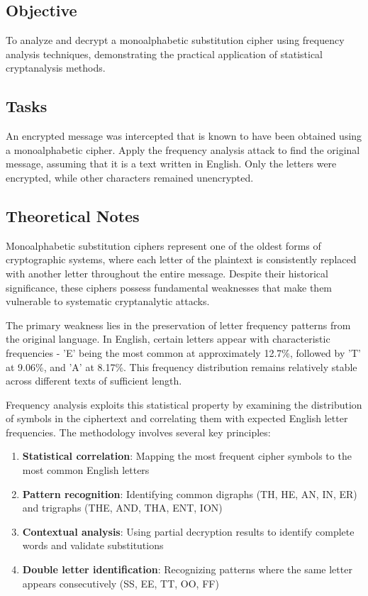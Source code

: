 \documentclass[a4paper,12pt]{article}
\begin{document}
\subsection{Objective}
\label{sec:org7906629}
To analyze and decrypt a monoalphabetic substitution cipher using frequency analysis techniques, demonstrating the practical application of statistical cryptanalysis methods.
\subsection{Tasks}
\label{sec:orgedfc051}
An encrypted message was intercepted that is known to have been obtained using a monoalphabetic cipher. Apply the frequency analysis attack to find the original message, assuming that it is a text written in English. Only the letters were encrypted, while other characters remained unencrypted.
\subsection{Theoretical Notes}
\label{sec:orgce1c731}
Monoalphabetic substitution ciphers represent one of the oldest forms of cryptographic systems, where each letter of the plaintext is consistently replaced with another letter throughout the entire message. Despite their historical significance, these ciphers possess fundamental weaknesses that make them vulnerable to systematic cryptanalytic attacks.

The primary weakness lies in the preservation of letter frequency patterns from the original language. In English, certain letters appear with characteristic frequencies - 'E' being the most common at approximately 12.7\%, followed by 'T' at 9.06\%, and 'A' at 8.17\%. This frequency distribution remains relatively stable across different texts of sufficient length.

Frequency analysis exploits this statistical property by examining the distribution of symbols in the ciphertext and correlating them with expected English letter frequencies. The methodology involves several key principles:

\begin{enumerate}
\item \textbf{Statistical correlation}: Mapping the most frequent cipher symbols to the most common English letters
\item \textbf{Pattern recognition}: Identifying common digraphs (TH, HE, AN, IN, ER) and trigraphs (THE, AND, THA, ENT, ION)
\item \textbf{Contextual analysis}: Using partial decryption results to identify complete words and validate substitutions
\item \textbf{Double letter identification}: Recognizing patterns where the same letter appears consecutively (SS, EE, TT, OO, FF)
\end{enumerate}
\end{document}
